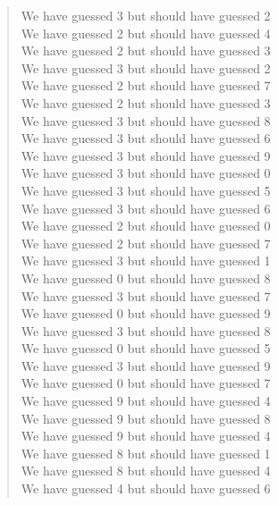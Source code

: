 \documentclass{article}
\begin{document}
\begin{quote}
        We have guessed 3 but should have guessed 2\\
        We have guessed 2 but should have guessed 4\\
        We have guessed 2 but should have guessed 3\\
        We have guessed 3 but should have guessed 2\\
        We have guessed 2 but should have guessed 7\\
        We have guessed 2 but should have guessed 3\\
        We have guessed 3 but should have guessed 8\\
        We have guessed 3 but should have guessed 6\\
        We have guessed 3 but should have guessed 9\\
        We have guessed 3 but should have guessed 0\\
        We have guessed 3 but should have guessed 5\\
        We have guessed 3 but should have guessed 6\\
        We have guessed 2 but should have guessed 0\\
        We have guessed 2 but should have guessed 7\\
        We have guessed 3 but should have guessed 1\\
        We have guessed 0 but should have guessed 8\\
        We have guessed 3 but should have guessed 7\\
        We have guessed 0 but should have guessed 9\\
        We have guessed 3 but should have guessed 8\\
        We have guessed 0 but should have guessed 5\\
        We have guessed 3 but should have guessed 9\\
        We have guessed 0 but should have guessed 7\\
        We have guessed 9 but should have guessed 4\\
        We have guessed 9 but should have guessed 8\\
        We have guessed 9 but should have guessed 4\\
        We have guessed 8 but should have guessed 1\\
        We have guessed 8 but should have guessed 4\\
        We have guessed 4 but should have guessed 6\\

\end{quote}
\end{document}
